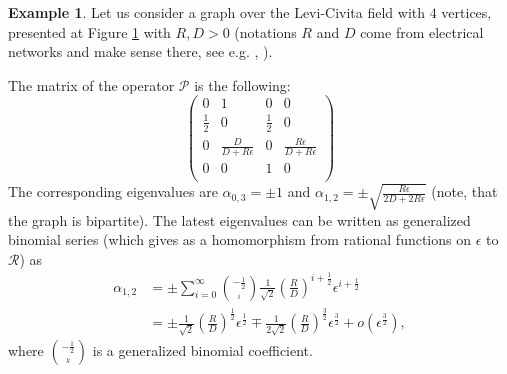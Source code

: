 \documentclass[a4paper,12pt]{amsart}
\theoremstyle{definition}
\newtheorem{example}{Example}
\newcommand{\R}{\mathcal{R}}
\begin{document}
\begin{example}
Let us consider a graph over the Levi-Civita field with $4$ vertices, presented at Figure \ref{Fig1} with $R,D>0$ (notations $R$ and $D$ come from electrical networks and make sense there, see e.g. \cite{Muranova1}, \cite{Muranova2}).

\begin{figure}[H]\label{Fig1}
\centering
{}
\caption{}
\end{figure}
The matrix of the operator $\mathcal P$ is the following:
\begin{equation*}
\left(
\begin{array}{cccc}
0&1&0&0\\
\frac{1}{2}&0&\frac{1}{2}&0\\
0&\frac{D}{D+R\epsilon}&0&\frac{R\epsilon}{D+R\epsilon}\\
0&0&1&0\\
\end{array}\right)
\end{equation*}
The corresponding eigenvalues are $\alpha_{0,3}=\pm 1$ and $\alpha_{1,2}=\pm \sqrt{\frac{R\epsilon}{2D+2R\epsilon}}$ (note, that the graph is bipartite). The latest eigenvalues can be written as generalized binomial series (which gives as a homomorphism from rational functions on $\epsilon$ to $\R$) as
\begin{align*}
\alpha_{1,2}&=\pm \sum_{i=0}^\infty {{-\frac{1}{2}} \choose_i}\frac{1}{\sqrt{2}}\left(\frac{R}{D}\right)^{i+\frac{1}{2}}\epsilon^{i+\frac{1}{2}}\\
&=\pm \frac{1}{\sqrt{2}}\left(\frac{R}{D}\right)^\frac{1}{2}\epsilon^{\frac{1}{2}}\mp\frac{1}{2\sqrt{2}}\left(\frac{R}{D}\right)^{\frac{3}{2}}\epsilon^{\frac{3}{2}}+o(\epsilon^{\frac{3}{2}}),
\end{align*}
where ${{-\frac{1}{2}} \choose_k}$ is a generalized binomial coefficient.


\end{example}
\end{document}
